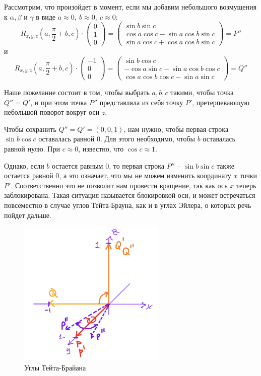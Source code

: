 \documentclass[fleqn]{extarticle}
\begin{document}
	Рассмотрим, что произойдет в момент, если мы добавим небольшого возмущения к $\alpha, \beta$ и $\gamma$ в виде $a \approx 0, ~ b \approx 0, ~ c \approx 0$:
	\[ R_{x, y, z}\left(a, \frac{\pi}{2} + b, c \right) \cdot \begin{pmatrix} 0 \\ 1 \\ 0 \end{pmatrix} = \begin{pmatrix} \sin{b}\sin{c} \\ \cos{a}\cos{c} - \sin{a} \cos{b} \sin{c} \\ \sin{a} \cos{c} + \cos{a} \cos{b} \sin{c} \end{pmatrix} = P'' \]
	и
	\[ R_{x, y, z}\left(a, \frac{\pi}{2} + b, c \right) \cdot \begin{pmatrix} -1 \\ 0 \\ 0 \end{pmatrix} = \begin{pmatrix} \sin{b} \cos{c} \\ -\cos{a}\sin{c} - \sin{a} \cos{b} \cos{c} \\ \cos{a} \cos{b} \cos{c} - \sin{a} \sin{c} \end{pmatrix} = Q'' \]

	Наше пожелание состоит в том, чтобы выбрать $a, b, c$ такими, чтобы точка $Q'' = Q'$, и при этом точка $P''$ представляла из себя точку $P'$, претерпевающую небольшой поворот вокруг оси $z$.

	Чтобы сохранить $Q'' = Q' = (0, 0, 1)$, нам нужно, чтобы первая строка $\sin{b} \cos{c}$ оставалась равной $0$. 
	Для этого необходимо, чтобы $b$ оставалась равной нулю. При $c \approx 0$, известно, что $\cos{c} \approx 1$.

	Однако, если $b$ остается равным $0$, то первая строка $P''$ -- $\sin{b} \sin{c}$ также остается равной $0$, 
	а это означает, что мы не можем изменить координату $x$ точки $P'$. Соответственно это не позволит нам провести 
	вращение, так как ось $x$ теперь заблокирована. Такая ситуация называется блокировкой оси, и может встречаться повсеместно 
	в случае углов Тейта-Брауна, как и в углах Эйлера, о которых речь пойдет дальше.

	\begin{figure}[h]
		\centering
		\includegraphics[width=7cm]{pictures/bryan.png}
		\caption{Углы Тейта-Брайана}
	\end{figure}
\end{document}
